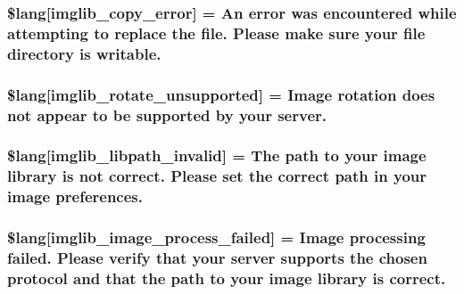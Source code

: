 \subsubsection[{\$lang}]{\setlength{\rightskip}{0pt plus 5cm}\$lang\mbox{[}\textquotesingle{}imglib\+\_\+copy\+\_\+error\textquotesingle{}\mbox{]} = \textquotesingle{}An error was encountered while attempting to replace the file. Please make sure your file directory is writable.\textquotesingle{}}\label{imglib__lang_8php_a012b6a0d2b3a8ef934e8783d2fbd6535}
\hypertarget{imglib__lang_8php_ab1c77c6b58fc5bf8e979ab4237ec87e7}{}
\subsubsection[{\$lang}]{\setlength{\rightskip}{0pt plus 5cm}\$lang\mbox{[}\textquotesingle{}imglib\+\_\+rotate\+\_\+unsupported\textquotesingle{}\mbox{]} = \textquotesingle{}Image rotation does not appear to be supported by your server.\textquotesingle{}}\label{imglib__lang_8php_ab1c77c6b58fc5bf8e979ab4237ec87e7}
\hypertarget{imglib__lang_8php_a8f190c17a02ca89334c8bf0a04333f65}{}
\subsubsection[{\$lang}]{\setlength{\rightskip}{0pt plus 5cm}\$lang\mbox{[}\textquotesingle{}imglib\+\_\+libpath\+\_\+invalid\textquotesingle{}\mbox{]} = \textquotesingle{}The path to your image library is not correct. Please set the correct path in your image preferences.\textquotesingle{}}\label{imglib__lang_8php_a8f190c17a02ca89334c8bf0a04333f65}
\hypertarget{imglib__lang_8php_a9ac6659eb97dd12e5c714cc9635cf22e}{}
\subsubsection[{\$lang}]{\setlength{\rightskip}{0pt plus 5cm}\$lang\mbox{[}\textquotesingle{}imglib\+\_\+image\+\_\+process\+\_\+failed\textquotesingle{}\mbox{]} = \textquotesingle{}Image processing failed. Please verify that your server supports the chosen protocol and that the path to your image library is correct.\textquotesingle{}}\label{imglib__lang_8php_a9ac6659eb97dd12e5c714cc9635cf22e}
\hypertarget{imglib__lang_8php_a1110d59ea8fd0564e78068dbda3438fb}{}
